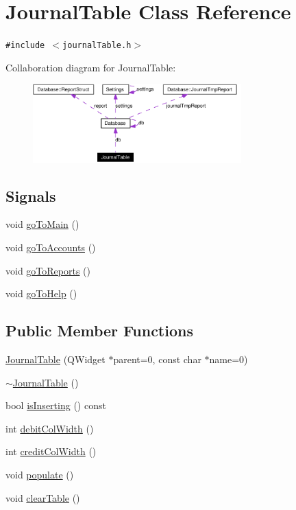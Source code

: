 \hypertarget{classJournalTable}{
\section{Journal\-Table Class Reference}
\label{classJournalTable}
}
{\tt \#include $<$journal\-Table.h$>$}

Collaboration diagram for Journal\-Table:\begin{figure}[H]
\begin{center}
\leavevmode
\includegraphics[width=228pt]{classJournalTable__coll__graph}
\end{center}
\end{figure}
\subsection*{Signals}
\begin{CompactItemize}
\item 
void \hyperlink{classJournalTable_l0}{go\-To\-Main} ()
\item 
void \hyperlink{classJournalTable_l1}{go\-To\-Accounts} ()
\item 
void \hyperlink{classJournalTable_l2}{go\-To\-Reports} ()
\item 
void \hyperlink{classJournalTable_l3}{go\-To\-Help} ()
\end{CompactItemize}
\subsection*{Public Member Functions}
\begin{CompactItemize}
\item 
\hyperlink{classJournalTable_a0}{Journal\-Table} (QWidget $\ast$parent=0, const char $\ast$name=0)
\item 
\hyperlink{classJournalTable_a1}{$\sim$Journal\-Table} ()
\item 
bool \hyperlink{classJournalTable_a2}{is\-Inserting} () const
\item 
int \hyperlink{classJournalTable_a3}{debit\-Col\-Width} ()
\item 
int \hyperlink{classJournalTable_a4}{credit\-Col\-Width} ()
\item 
void \hyperlink{classJournalTable_a5}{populate} ()
\item 
void \hyperlink{classJournalTable_a6}{clear\-Table} ()
\end{CompactItemize}

